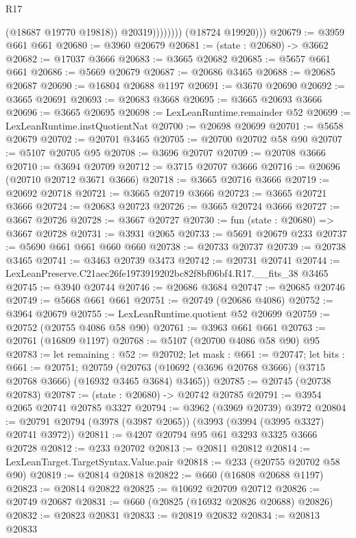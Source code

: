 \begin{lexlean}{R17}
\begin{coremodule}
                          (@18687 @19770 @19818))
                        @20319))))))))
        (@18724 @19920)))
@20679 := @3959 @661 @661
@20680 := @3960 @20679
@20681 := (state : @20680) -> @3662
@20682 := @17037 @3666
@20683 := @3665 @20682
@20685 := @5657 @661 @661
@20686 := @5669 @20679
@20687 := @20686 @3465
@20688 := @20685 @20687
@20690 := @16804 @20688 @1197
@20691 := @3670 @20690
@20692 := @3665 @20691
@20693 := @20683 @3668
@20695 := @3665 @20693 @3666
@20696 := @3665 @20695
@20698 := LexLeanRuntime.remainder @52
@20699 := LexLeanRuntime.instQuotientNat
@20700 := @20698 @20699
@20701 := @5658 @20679
@20702 := @20701 @3465
@20705 := @20700 @20702 @58 @90
@20707 := @5107 @20705 @95
@20708 := @3696 @20707
@20709 := @20708 @3666
@20710 := @3694 @20709
@20712 := @3715 @20707 @3666
@20716 := @20696 (@20710 @20712 @3671 @3666)
@20718 := @3665 @20716 @3666
@20719 := @20692 @20718
@20721 := @3665 @20719 @3666
@20723 := @3665 @20721 @3666
@20724 := @20683 @20723
@20726 := @3665 @20724 @3666
@20727 := @3667 @20726
@20728 := @3667 @20727
@20730 := fun (state : @20680) => @3667 @20728
@20731 := @3931 @2065
@20733 := @5691 @20679 @233
@20737 := @5690 @661 @661 @660 @660
@20738 := @20733 @20737
@20739 := @20738 @3465
@20741 := @3463 @20739 @3473
@20742 := @20731 @20741
@20744 := LexLeanPreserve.C21aec26fe1973919202bc82f8bf06bf4.R17.__fits_38 @3465
@20745 := @3940 @20744
@20746 := @20686 @3684
@20747 := @20685 @20746
@20749 := @5668 @661 @661
@20751 := @20749 (@20686 @4086)
@20752 := @3964 @20679
@20755 := LexLeanRuntime.quotient @52 @20699
@20759 := @20752 (@20755 @4086 @58 @90)
@20761 := @3963 @661 @661
@20763 := @20761 (@16809 @1197)
@20768 := @5107 (@20700 @4086 @58 @90) @95
@20783 := let remaining : @52 := @20702;
  let mask : @661 := @20747;
  let bits : @661 := @20751;
  @20759 (@20763 (@10692 (@3696 @20768 @3666) (@3715 @20768 @3666) (@16932 @3465 @3684) @3465))
@20785 := @20745 (@20738 @20783)
@20787 := (state : @20680) -> @20742 @20785
@20791 := @3954 @2065 @20741 @20785 @3327
@20794 := @3962 (@3969 @20739) @3972
@20804 := @20791 @20794 (@3978 (@3987 @2065)) (@3993 (@3994 (@3995 @3327) @20741 @3972))
@20811 := @4207 @20794 @95 @61 @3293 @3325 @3666 @20728
@20812 := @233 @20702
@20813 := @20811 @20812
@20814 := LexLeanTarget.TargetSyntax.Value.pair
@20818 := @233 (@20755 @20702 @58 @90)
@20819 := @20814 @20818
@20822 := @660 (@16808 @20688 @1197)
@20823 := @20814 @20822
@20825 := @10692 @20709 @20712
@20826 := @20749 @20687
@20831 := @660 (@20825 (@16932 @20826 @20688) @20826)
@20832 := @20823 @20831
@20833 := @20819 @20832
@20834 := @20813 @20833

\end{coremodule}
\end{lexlean}
